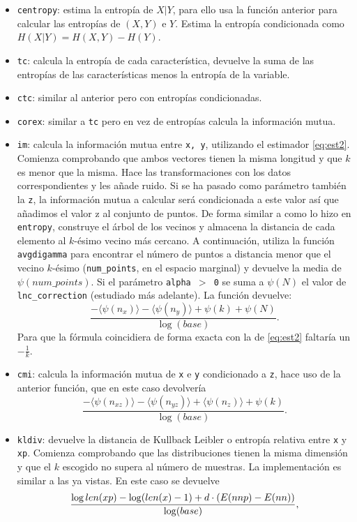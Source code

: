 \documentclass[10pt,a4paper]{article} %
\let\mathbb\relax
\theoremstyle{definition}
\begin{document}
\begin{itemize}
\item \texttt{centropy}: estima la entropía de $X|Y$, para ello usa la función anterior para calcular las entropías de $(X,Y)$ e $Y$. Estima la entropía condicionada como $H(X|Y) = H(X,Y)-H(Y)$.
\item \texttt{tc}: calcula la entropía de cada característica, devuelve la suma de las entropías de las características menos la entropía de la variable.
\item \texttt{ctc}: similar al anterior pero con entropías condicionadas.
\item \texttt{corex}: similar a \texttt{tc} pero en vez de entropías calcula la información mutua.
\item \texttt{im}: calcula la información mutua entre \texttt{x, y}, utilizando el estimador \ref{eq:est2}. Comienza comprobando que ambos vectores tienen la misma longitud y que $k$ es menor que la misma. Hace las transformaciones con los datos correspondientes y les añade ruido. Si se ha pasado como parámetro también la  \texttt{z}, la información mutua a calcular será condicionada a este valor así que añadimos el valor z al conjunto de puntos. De forma similar a como lo hizo en \texttt{entropy}, construye el árbol de los vecinos y almacena la distancia de cada elemento al $k$-ésimo vecino más cercano. A continuación, utiliza la función \texttt{avgdigamma} para encontrar el número de puntos a distancia menor que el vecino $k$-ésimo (\texttt{num\_points}, en el espacio marginal) y devuelve la media de $\psi(num\_points)$. Si el parámetro \texttt{alpha $>$ 0} se suma a $\psi(N)$ el valor de \texttt{lnc\_correction} (estudiado más adelante). La función devuelve:\[
\frac{- \langle \psi(n_x) \rangle - \langle \psi(n_y) \rangle + \psi(k) + \psi(N)}{\log (base)}.
\]
Para que la fórmula coincidiera de forma exacta con la de \ref{eq:est2} faltaría un $-\frac{1}{k}$.
\item \texttt{cmi}: calcula la información mutua de \texttt{x} e \texttt{y} condicionado a \texttt{z}, hace uso de la anterior función, que en este caso devolvería \[
  \frac{- \langle\psi(n_{xz})\rangle - \langle\psi(n_{yz})\rangle + \langle\psi(n_z)\rangle + \psi(k)}{\log(base)}.
\]
\item \texttt{kldiv}: devuelve la distancia de Kullback Leibler o entropía relativa entre \texttt{x} y \texttt{xp}. Comienza comprobando que las distribuciones tienen la misma dimensión y que el $k$ escogido no supera al número de muestras. La implementación es similar a las ya vistas. En este caso se devuelve\[
\frac{\log len(xp) - \log(len(x) -1) + d \cdot (\mathbb{E}( nnp) - \mathbb{E} (nn))}{\log(base)},
\]


\end{itemize}
\end{document}
